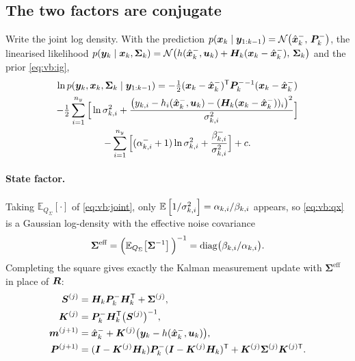 \subsection{The two factors are conjugate}
Write the joint log density.  With the prediction
$p(\bm{x}_k\mid\bm{y}_{1:k-1}) = \mathcal{N}\!\left(\hat{\bm{x}}^{-}_k,\,\bm{P}^{-}_k\right)$, the linearised likelihood
$p(\bm{y}_k\mid\bm{x}_k,\bm\Sigma_k)=\mathcal{N}\!\left(h(\hat{\bm{x}}^{-}_k,\bm{u}_k)+\bm{H}_k(\bm{x}_k-\hat{\bm{x}}^{-}_k),\,\bm\Sigma_k\right)$ and the
prior \eqref{eq:vb:ig},
\begin{multline}
\ln p(\bm{y}_k,\bm{x}_k,\bm\Sigma_k\mid\bm{y}_{1:k-1}) = -\tfrac12(\bm{x}_k-\hat{\bm{x}}^{-}_k)^{\mathsf{T}}\bm{P}^{-}_k{}^{-1}(\bm{x}_k-\hat{\bm{x}}^{-}_k)\\
-\tfrac12\sum_{i=1}^{n_y}\Big[\ln\sigma^2_{k,i} + \frac{\big(y_{k,i}-h_i(\hat{\bm{x}}^{-}_k,\bm{u}_k)-(\bm{H}_k(\bm{x}_k-\hat{\bm{x}}^{-}_k))_i\big)^2}{\sigma^2_{k,i}}\Big]\\
-\sum_{i=1}^{n_y}\Big[(\alpha^-_{k,i}+1)\ln\sigma^2_{k,i}+\frac{\beta^-_{k,i}}{\sigma^2_{k,i}}\Big] + c .
\label{eq:vb:joint}
\end{multline}

\paragraph{State factor.}  Taking $\mathbb{E}_{Q_\Sigma}\!\left[\cdot\right]$ of \eqref{eq:vb:joint}, only
$\mathbb{E}\left[1/\sigma^2_{k,i}\right]=\alpha_{k,i}/\beta_{k,i}$ appears, so \eqref{eq:vb:qx} is a Gaussian
log-density with the effective noise covariance
\begin{equation}
\bm{\Sigma}^{\text{eff}} = \Big(\mathbb{E}_{Q_\Sigma}\!\left[\bm\Sigma^{-1}\right]\Big)^{-1} = \operatorname{diag}\!\big(\beta_{k,i}/\alpha_{k,i}\big).
\label{eq:vb:Sigeff}
\end{equation}
Completing the square gives exactly the Kalman measurement update with $\bm\Sigma^{\text{eff}}$ in
place of $\bm{R}$:
\begin{align}
\bm{S}^{(j)} &= \bm{H}_k\bm{P}^{-}_k\bm{H}_k^{\mathsf{T}} + \bm\Sigma^{(j)}, \label{eq:vb:S}\\
\bm{K}^{(j)} &= \bm{P}^{-}_k\bm{H}_k^{\mathsf{T}}\big(\bm{S}^{(j)}\big)^{-1}, \label{eq:vb:K}\\
\bm m^{(j+1)} &= \hat{\bm{x}}^{-}_k + \bm{K}^{(j)}\big(\bm{y}_k - h(\hat{\bm{x}}^{-}_k,\bm{u}_k)\big), \label{eq:vb:m}\\
\bm{P}^{(j+1)} &= (\bm{I}-\bm{K}^{(j)}\bm{H}_k)\bm{P}^{-}_k(\bm{I}-\bm{K}^{(j)}\bm{H}_k)^{\mathsf{T}} + \bm{K}^{(j)}\bm\Sigma^{(j)}\bm{K}^{(j)\mathsf{T}}. \label{eq:vb:P}
\end{align}

